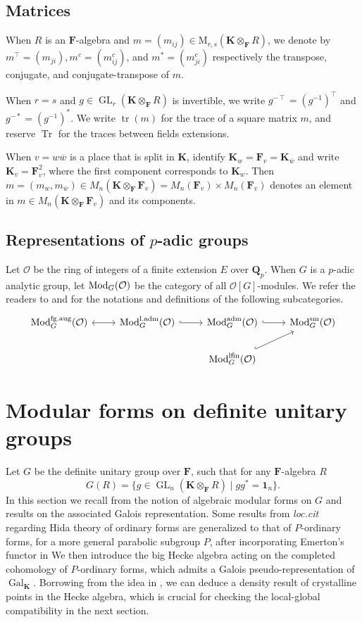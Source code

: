 \documentclass[leqno]{amsart}
\newcommand{\bw}{\overline{w}}
\newcommand{\aMod}{\textnormal{Mod}^{\textnormal{adm}}}
\newcommand{\laMod}{\textnormal{Mod}^{\textnormal{l.adm}}}
\newcommand{\lfMod}{\textnormal{Mod}^{\textnormal{lfin}}}
\newcommand{\fgMod}{\textnormal{Mod}^{\textnormal{fg.aug}}}
\DeclareMathOperator{\Mod}{\textnormal{Mod}}
\DeclareMathOperator{\Gal}{Gal}
\newcommand{\sm}{\textnormal{sm}}
\DeclareMathOperator{\GL}{GL}
\DeclareMathOperator{\mtr}{tr}
\newcommand{\id}{\mathbf{1}}
\newcommand{\Qp}{\mathbf{Q}_p}
\DeclareMathOperator{\Tr}{Tr} %
\newcommand{\F}{{\mathbf{F}}} %
\newcommand{\K}{{\mathbf{K}}} %
\newcommand{\oo}{\mathcal{O}} %
\theoremstyle{definition}
\theoremstyle{remark}
\begin{document}
\subsection{Matrices}
When $R$ is an $\F$-algebra and 
$m=(m_{ij})\in \text{M}_{r,s}(\K\otimes_\F R)$,
we denote by 
$m^\intercal=(m_{ji}), 
m^c=(m^c_{ij})$, and
$m^*=(m^c_{ji})$
respectively the transpose, conjugate, and conjugate-transpose of $m$.

When $r=s$ and $g\in \GL_r(\K\otimes_\F R)$ is invertible, we write
$g^{-\intercal}=(g^{-1})^\intercal$ and $g^{-*}=(g^{-1})^*$.
We write $\mtr(m)$ for the trace of a square matrix $m$,
and reserve $\Tr$ for the traces between fields extensions.

When $v=w\bw$ is a place that is split in $\K$,
identify $\K_w=\F_v=\K_{\bw}$ and 
write $\K_v=\F_v^2$, 
where the first component corresponds to $\K_w$.
Then $m=(m_w,m_{\bw})\in M_n(\K\otimes_\F\F_v)=M_n(\F_v)\times M_n(\F_v)$ 
denotes an element in $m\in M_n(\K\otimes_\F\F_v)$ and its components.

\subsection{Representations of $p$-adic groups}

Let $\oo$ be the ring of integers of a finite extension $E$
over  $\Qp$.
When $G$ is a $p$-adic analytic group,
let $\Mod_G(\oo)$ be the category
of all $\oo[G]$-modules.
We refer the readers to \cite[\S 2]{emeI} and \cite[\S 2]{pask}
for the notations and definitions of the following subcategories.
\[
\begin{tikzcd}
	\fgMod_{G}(\oo) \arrow[r,leftrightarrow] &
	\laMod_{G}(\oo) \arrow[r,hookrightarrow] &
	\aMod_{G}(\oo) \arrow[r,hookrightarrow] &
	\Mod^{\sm}_{G}(\oo) \\
					       &&
	\lfMod_{G}(\oo) \arrow[ru,hookrightarrow] &
\end{tikzcd}
\]



\section{Modular forms on definite unitary groups}

Let $G$ be the definite unitary group over $\F$,
such that for any $\F$-algebra $R$
\[
    G(R)=\{g\in \GL_{n}(\K\otimes_\F R) \mid gg^*=\id_n\}.
\]
In this section we recall from \cite{ger}
the notion of algebraic modular forms on $G$
and results on the associated Galois representation.
Some results from \textit{loc.cit}
regarding Hida theory of ordinary forms
are generalized
to that of $P$-ordinary forms,
for a more general parabolic subgroup $P$,
after incorporating Emerton's functor in \cite{emeI}
We then introduce 
the big Hecke algebra acting on 
the completed cohomology of $P$-ordinary forms,
which admits a Galois pseudo-representation
of $\Gal_\K$.
Borrowing from the idea in \cite{pan},
we can deduce a density result
of crystalline points in the Hecke algebra,
which is crucial for checking 
the local-global compatibility in the next section.
\end{document}
